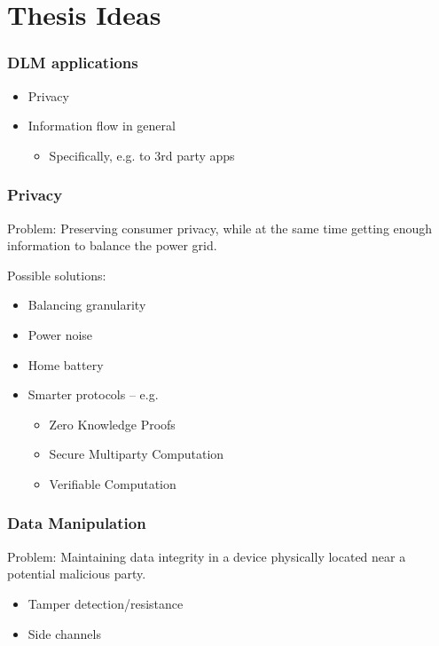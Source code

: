 
\section{Thesis Ideas}

\begin{frame}
  \frametitle{DLM applications}

  \begin{itemize}
    \item Privacy
    \item Information flow in general
    \begin{itemize}
      \item Specifically, e.g. to 3rd party apps
    \end{itemize}
  \end{itemize}
\end{frame}

\begin{frame}
  \frametitle{Privacy}

  Problem: Preserving consumer privacy, while at the same time getting enough information to balance the power grid.

  Possible solutions:
  \begin{itemize}
    \item Balancing granularity
    \item Power noise
    \item Home battery
    \item Smarter protocols -- e.g.
    \begin{itemize}
      \item Zero Knowledge Proofs
      \item Secure Multiparty Computation
      \item Verifiable Computation
    \end{itemize}
  \end{itemize}
\end{frame}

\begin{frame}
  \frametitle{Data Manipulation}

  Problem: Maintaining data integrity in a device physically located near a potential malicious party.

  \begin{itemize}
    \item Tamper detection/resistance
    \item Side channels
  \end{itemize}
\end{frame}
